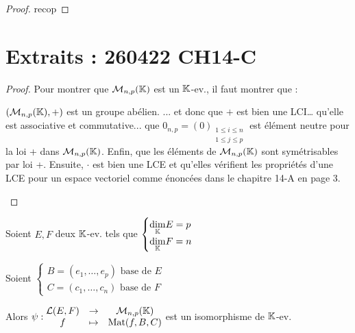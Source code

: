\documentclass[12pt,a4paper]{report}
\begin{document}
\begin{proof}
    recop

\end{proof}


\vspace{1em}


\section*{Extraits : 260422 CH14-C}


\begin{proof}
    Pour montrer que $\mathcal M_{n,p}(\mathbb{K})$ est un $\mathbb{K}$-ev., il faut montrer que :
    \begin{outline}
        \1 $(\mathcal M_{n,p}(\mathbb{K}),+)$ est un groupe abélien.
        \2 ... et donc que $+$ est bien une LCI\dots
        \2 qu'elle est associative et commutative...
        \2 que $0_{n,p} = (0)_{\substack{1 \le i \le n \\ 1 \le j \le p}}$ est élément neutre pour la loi + dans $\mathcal M_{n,p}(\mathbb{K})$.
        \2 Enfin, que les éléments de $\mathcal M_{n,p}(\mathbb{K})$ sont symétrisables par loi +.
        \1 Ensuite, $\cdot$ est bien une LCE et qu'elles vérifient les propriétés d'une LCE pour un espace vectoriel comme énoncées dans le chapitre 14-A en page 3.
    \end{outline}
\end{proof}

\begin{theorem}
    Soient $E,F$ deux $\mathbb{K}$-ev. tels que $\begin{cases}
    \underset{\mathbb{K}}\dim E = p\\ \underset{\mathbb{K}}\dim F = n
    \end{cases}$

    Soient $\begin{cases}
    B = (e_1,\dots,e_p) \text{ base de } E\\
    C = (c_1,\dots,c_n) \text{ base de } F
    \end{cases}$

    Alors $\psi : \begin{matrix}
    \mathcal{L}(E,F) &\to &\mathcal M_{n,p}(\mathbb{K})\\
    f &\mapsto & \mathrm{Mat}(f,B,C)
    \end{matrix}$ est un isomorphisme de $\mathbb{K}$-ev.
\end{theorem}
\end{document}
